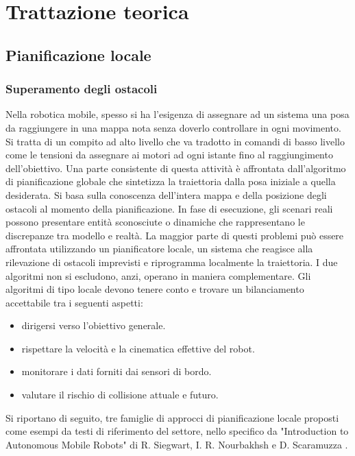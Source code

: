 \section{Trattazione teorica}

\subsection{Pianificazione locale}
\subsubsection{Superamento degli ostacoli}
Nella robotica mobile, spesso si ha l'esigenza di assegnare ad un sistema una posa da raggiungere in una mappa nota senza doverlo controllare in ogni movimento. Si tratta di un compito ad alto livello che va tradotto in comandi di basso livello come le tensioni da assegnare ai motori ad ogni istante fino al raggiungimento dell'obiettivo. Una parte consistente di questa attività è affrontata dall'algoritmo di pianificazione globale che sintetizza la traiettoria dalla posa iniziale a quella desiderata. Si basa sulla conoscenza dell'intera mappa e della posizione degli ostacoli al momento della pianificazione. In fase di esecuzione, gli scenari reali possono presentare entità sconosciute o dinamiche che rappresentano le discrepanze tra modello e realtà. La maggior parte di questi problemi può essere affrontata utilizzando un pianificatore locale, un sistema che reagisce alla rilevazione di ostacoli imprevisti e riprogramma localmente la traiettoria. I due algoritmi non si escludono, anzi, operano in maniera complementare. Gli algoritmi di tipo locale devono tenere conto e trovare un bilanciamento accettabile tra i seguenti aspetti: 
\begin{itemize}
    \item dirigersi verso l'obiettivo generale.
    \item rispettare la velocità e la cinematica effettive del robot.
    \item monitorare i dati forniti dai sensori di bordo.
    \item valutare il rischio di collisione attuale e futuro.
\end{itemize}
Si riportano di seguito, tre famiglie di approcci di pianificazione locale proposti come esempi da testi di riferimento del settore, nello specifico da "Introduction to Autonomous Mobile Robots" di R. Siegwart, I. R. Nourbakhsh e D. Scaramuzza \cite{siegwart2011introduction}.


